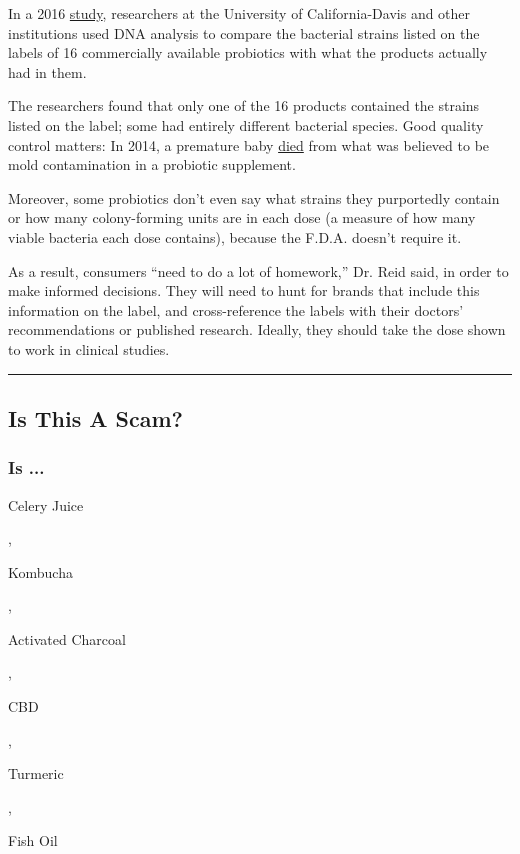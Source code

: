 In a 2016
\href{https://www.ncbi.nlm.nih.gov/pmc/articles/PMC4916961/}{study},
researchers at the University of California-Davis and other institutions
used DNA analysis to compare the bacterial strains listed on the labels
of 16 commercially available probiotics with what the products actually
had in them.

The researchers found that only one of the 16 products contained the
strains listed on the label; some had entirely different bacterial
species. Good quality control matters: In 2014, a premature baby
\href{https://www.ncbi.nlm.nih.gov/pmc/articles/PMC4584706/}{died} from
what was believed to be mold contamination in a probiotic supplement.

Moreover, some probiotics don't even say what strains they purportedly
contain or how many colony-forming units are in each dose (a measure of
how many viable bacteria each dose contains), because the F.D.A. doesn't
require it.

As a result, consumers ``need to do a lot of homework,'' Dr. Reid said,
in order to make informed decisions. They will need to hunt for brands
that include this information on the label, and cross-reference the
labels with their doctors' recommendations or published research.
Ideally, they should take the dose shown to work in clinical studies.

\begin{center}\rule{0.5\linewidth}{\linethickness}\end{center}

\hypertarget{is-this-a-scam}{%
\subsection{Is This A Scam?}\label{is-this-a-scam}}

\hypertarget{is-}{%
\subsubsection{Is ...}\label{is-}}

Celery Juice

,

Kombucha

,

Activated Charcoal

,

CBD

,

Turmeric

,

Fish Oil

